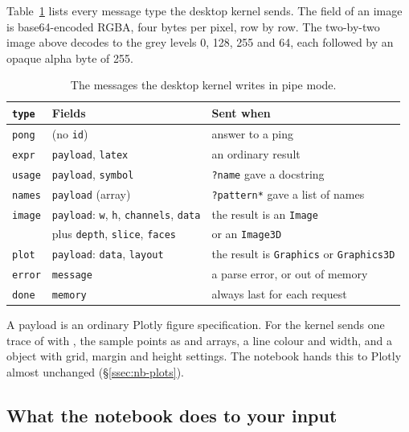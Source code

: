 Table~\ref{tab:nb-messages} lists every message type the desktop kernel
sends. The  field of an image is base64-encoded RGBA, four bytes
per pixel, row by row. The two-by-two image above decodes to the grey levels
0, 128, 255 and 64, each followed by an opaque alpha byte of 255.

\begin{table}[htbp]
\centering
\small
\begin{tabular}{@{}lll@{}}
\toprule
\textbf{\texttt{type}} & \textbf{Fields} & \textbf{Sent when} \\
\midrule
\texttt{pong}  & (no \texttt{id}) & answer to a ping \\
\texttt{expr}  & \texttt{payload}, \texttt{latex} & an ordinary result \\
\texttt{usage} & \texttt{payload}, \texttt{symbol} & \texttt{?name} gave a docstring \\
\texttt{names} & \texttt{payload} (array) & \texttt{?pattern*} gave a list of names \\
\texttt{image} & \texttt{payload}: \texttt{w}, \texttt{h}, \texttt{channels}, \texttt{data} & the result is an \texttt{Image} \\
       & \quad plus \texttt{depth}, \texttt{slice}, \texttt{faces} & \quad or an \texttt{Image3D} \\
\texttt{plot}  & \texttt{payload}: \texttt{data}, \texttt{layout} & the result is \texttt{Graphics} or \texttt{Graphics3D} \\
\texttt{error} & \texttt{message} & a parse error, or out of memory \\
\texttt{done}  & \texttt{memory} & always last for each request \\
\bottomrule
\end{tabular}
\caption{The messages the desktop kernel writes in pipe mode.}
\label{tab:nb-messages}
\end{table}

A  payload is an ordinary Plotly figure specification. For
 the kernel sends one trace of
 with , the sample points as
 and  arrays, a line colour and width, and a 
object with grid, margin and height settings. The notebook hands this to
Plotly almost unchanged (\S\ref{ssec:nb-plots}).

\subsection{What the notebook does to your input}

